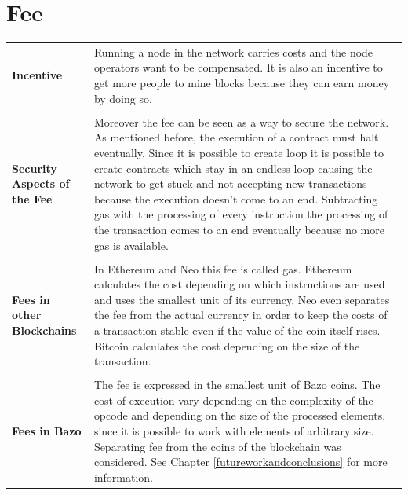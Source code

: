 \section{Fee} \label{fee}
\begin{tabular}[t]{ p{3cm} p{12.5cm}}
\raggedright
\textbf{Incentive} &
Running a node in the network carries costs and the node operators want to be compensated. It is also an incentive to get more people to mine blocks because they can earn money by doing so. \\ \\

\raggedright
\textbf{Security Aspects of the Fee} &
Moreover the fee can be seen as a way to secure the network. As mentioned before, the execution of a contract must halt eventually. Since it is possible to create loop it is possible to create contracts which stay in an endless loop causing the network to get stuck and not accepting new transactions because the execution doesn't come to an end. Subtracting gas with the processing of every instruction the processing of the transaction comes to an end eventually because no more gas is available. \\ \\

\raggedright
\textbf{Fees in other Blockchains} &
In Ethereum and Neo this fee is called gas. Ethereum calculates the cost depending on which instructions are used and uses the smallest unit of its currency. Neo even separates the fee from the actual currency in order to keep the costs of a transaction stable even if the value of the coin itself rises. Bitcoin calculates the cost depending on the size of the transaction. \\ \\

\raggedright
\textbf{Fees in Bazo} &
The fee is expressed in the smallest unit of Bazo coins. The cost of execution vary depending on the complexity of the opcode and depending on the size of the processed elements, since it is possible to work with elements of arbitrary size. Separating fee from the coins of the blockchain was considered. See Chapter \ref{futureworkandconclusions} for more information.
\end{tabular}

